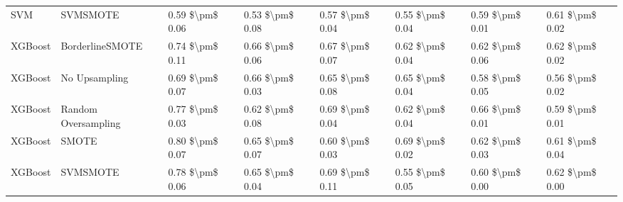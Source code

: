 \begin{tabular}{llllllll}
                            SVM &                      SVMSMOTE & 0.59 \$\textbackslash pm\$ 0.06 &           0.53 \$\textbackslash pm\$ 0.08 &       0.57 \$\textbackslash pm\$ 0.04 &        0.55 \$\textbackslash pm\$ 0.04 &                         0.59 \$\textbackslash pm\$ 0.01 & 0.61 \$\textbackslash pm\$ 0.02 \\
                        XGBoost &               BorderlineSMOTE & 0.74 \$\textbackslash pm\$ 0.11 &           0.66 \$\textbackslash pm\$ 0.06 &       0.67 \$\textbackslash pm\$ 0.07 &        0.62 \$\textbackslash pm\$ 0.04 &                         0.62 \$\textbackslash pm\$ 0.06 & 0.62 \$\textbackslash pm\$ 0.02 \\
                        XGBoost &                 No Upsampling & 0.69 \$\textbackslash pm\$ 0.07 &           0.66 \$\textbackslash pm\$ 0.03 &       0.65 \$\textbackslash pm\$ 0.08 &        0.65 \$\textbackslash pm\$ 0.04 &                         0.58 \$\textbackslash pm\$ 0.05 & 0.56 \$\textbackslash pm\$ 0.02 \\
                        XGBoost &           Random Oversampling & 0.77 \$\textbackslash pm\$ 0.03 &           0.62 \$\textbackslash pm\$ 0.08 &       0.69 \$\textbackslash pm\$ 0.04 &        0.62 \$\textbackslash pm\$ 0.04 &                         0.66 \$\textbackslash pm\$ 0.01 & 0.59 \$\textbackslash pm\$ 0.01 \\
                        XGBoost &                         SMOTE & 0.80 \$\textbackslash pm\$ 0.07 &           0.65 \$\textbackslash pm\$ 0.07 &       0.60 \$\textbackslash pm\$ 0.03 &        0.69 \$\textbackslash pm\$ 0.02 &                         0.62 \$\textbackslash pm\$ 0.03 & 0.61 \$\textbackslash pm\$ 0.04 \\
                        XGBoost &                      SVMSMOTE & 0.78 \$\textbackslash pm\$ 0.06 &           0.65 \$\textbackslash pm\$ 0.04 &       0.69 \$\textbackslash pm\$ 0.11 &        0.55 \$\textbackslash pm\$ 0.05 &                         0.60 \$\textbackslash pm\$ 0.00 & 0.62 \$\textbackslash pm\$ 0.00 \\
\bottomrule
\end{tabular}
